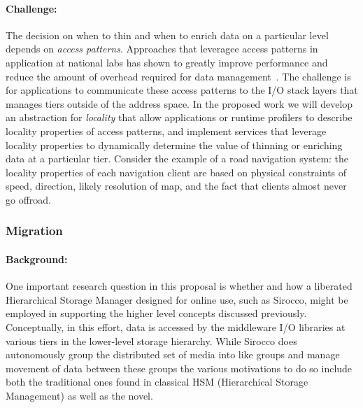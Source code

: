 
\paragraph{Challenge:} The decision on when to thin and when to
enrich data on a particular level depends on \emph{access patterns}.
Approaches that leveragee access patterns in application at national
labs has shown to greatly improve performance and reduce the amount
of overhead required for data management~\cite{he:hpdc13}. The
challenge is for applications to communicate these access patterns
to the I/O stack layers that manages tiers outside of the address
space. In the proposed work we will develop an abstraction for
\emph{locality} that allow applications or runtime profilers to
describe locality properties of access patterns, and implement
services that leverage locality properties to dynamically determine
the value of thinning or enriching data at a particular tier.
Consider the example of a road navigation system: the locality
properties of each navigation client are based on physical constraints
of speed, direction, likely resolution of map, and the fact that
clients almost never go offroad.

\subsubsection{Migration}
\label{sec:migration}

\paragraph{Background:} One important research question in this proposal is
whether and how a liberated Hierarchical Storage Manager designed for online
use, such as Sirocco, might be employed in supporting the higher level
concepts discussed previously. Conceptually, in this effort, data is
accessed by the middleware I/O libraries at various tiers in the lower-level
storage hierarchy. While Sirocco does autonomously group the distributed set
of media into like groups and manage movement of data between these groups
the various motivations to do so include both the traditional ones found in
classical HSM (Hierarchical Storage Management) as well as the novel.


